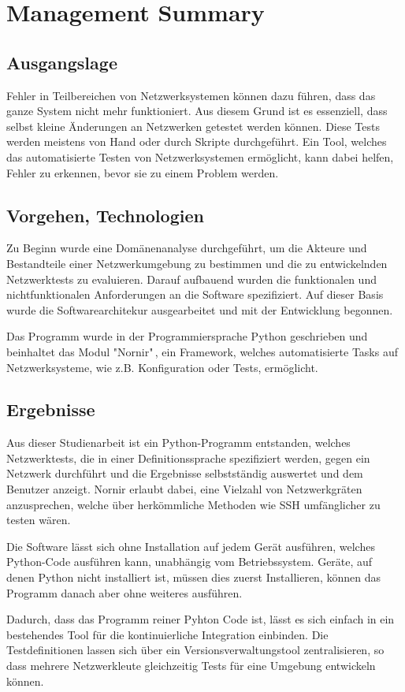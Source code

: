 \documentclass[]{subfiles}
\begin{document}
\section*{Management Summary}
   \subsection*{Ausgangslage}
   Fehler in Teilbereichen von Netzwerksystemen können dazu führen, 
   dass das ganze System nicht mehr funktioniert.
   Aus diesem Grund ist es essenziell, dass selbst kleine Änderungen
   an Netzwerken getestet werden können. 
   Diese Tests werden meistens von Hand oder durch Skripte durchgeführt.
   Ein Tool, welches das automatisierte Testen von Netzwerksystemen 
   ermöglicht, kann dabei helfen, Fehler zu erkennen, bevor sie zu
   einem Problem werden.

   \subsection*{Vorgehen, Technologien}
   Zu Beginn wurde eine Domänenanalyse durchgeführt, um die Akteure und 
   Bestandteile einer Netzwerkumgebung zu bestimmen und die zu entwickelnden
   Netzwerktests zu evaluieren.
   Darauf aufbauend wurden die funktionalen und nichtfunktionalen Anforderungen
   an die Software spezifiziert.
   Auf dieser Basis wurde die Softwarearchitekur ausgearbeitet und mit 
   der Entwicklung begonnen.

   Das Programm wurde in der Programmiersprache Python geschrieben und 
   beinhaltet das Modul "Nornir"\,, ein Framework, welches automatisierte
   Tasks auf Netzwerksysteme, wie z.B. Konfiguration oder Tests, ermöglicht. 

   \subsection*{Ergebnisse}
   Aus dieser Studienarbeit ist ein Python-Programm entstanden, welches 
   Netzwerktests, die in einer Definitionssprache spezifiziert werden,
   gegen ein Netzwerk durchführt und die Ergebnisse selbstständig auswertet
   und dem Benutzer anzeigt. Nornir erlaubt dabei, eine Vielzahl von 
   Netzwerkgräten anzusprechen, welche über herkömmliche Methoden wie
   SSH umfänglicher zu testen wären.

   Die Software lässt sich ohne Installation auf jedem Gerät ausführen, 
   welches Python-Code ausführen kann, unabhängig vom Betriebssystem.
   Geräte, auf denen Python nicht installiert ist, müssen dies zuerst
   Installieren, können das Programm danach aber ohne weiteres ausführen.

   Dadurch, dass das Programm reiner Pyhton Code ist, lässt es sich einfach
   in ein bestehendes Tool für die kontinuierliche Integration einbinden.
   Die Testdefinitionen lassen sich über ein Versionsverwaltungstool 
   zentralisieren, so dass mehrere Netzwerkleute gleichzeitig Tests für 
   eine Umgebung entwickeln können. 
   
\end{document}
